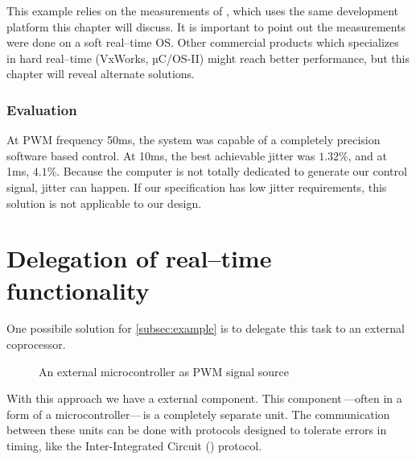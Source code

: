 This example relies on the measurements of \citep{rt-sched-thesis}, which uses the same development platform this chapter will discuss. It is important to point out the measurements were done on a soft real--time OS. Other commercial products which specializes in hard real--time (VxWorks, µC/OS-II) might reach better performance, but this chapter will reveal alternate solutions.

\subsubsection{Evaluation}

At PWM frequency 50ms, the system was capable of a completely precision software based control. At 10ms, the best achievable jitter was $1.32\%$, and at 1ms, $4.1\%$.
Because the computer is not totally dedicated to generate our control signal, jitter can happen. If our specification has low jitter requirements, this solution is not applicable to our design.

\section{Delegation of real--time functionality}

One possibile solution for \cref{subsec:example} is to delegate this task to an external coprocessor.

\begin{figure}[h]
	\centering
	\caption{An external microcontroller as PWM signal source}
	\label{fig:example_external_pwm}
\end{figure}

With this approach we have a external component. This component\,---often in a form of a microcontroller---\,is a completely separate unit. The communication between these units can be done with protocols designed to tolerate errors in timing, like the Inter-Integrated Circuit (\isc) protocol.

